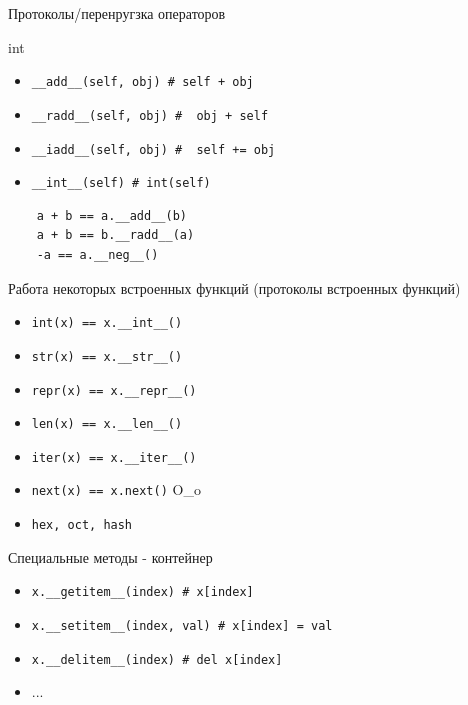 \documentclass{article}
\begin{document}
\begin{center} Протоколы/перенругзка операторов \end{center}
\begin{center} int \end{center}
\begin{itemize}
    \item \lstinline!__add__(self, obj) # self + obj!
    \item \lstinline!__radd__(self, obj) #  obj + self!
    \item \lstinline!__iadd__(self, obj) #  self += obj!
    \item \lstinline!__int__(self) # int(self)!
\end{itemize}
\begin{lstlisting}
    a + b == a.__add__(b)
    a + b == b.__radd__(a)
    -a == a.__neg__()
\end{lstlisting}
\newpage

\begin{center} Работа некоторых встроенных функций (протоколы встроенных функций) \end{center}
\begin{itemize}
    \item \lstinline!int(x) == x.__int__()!
    \item \lstinline!str(x) == x.__str__()!
    \item \lstinline!repr(x) == x.__repr__()!
    \item \lstinline!len(x) == x.__len__()!
    \item \lstinline!iter(x) == x.__iter__()!
    \item \lstinline!next(x) == x.next()! O\_o
    \item \lstinline!hex, oct, hash!
\end{itemize}
\newpage

\begin{center} Специальные методы - контейнер \end{center}
\begin{itemize}
    \item \lstinline!x.__getitem__(index) # x[index]!
    \item \lstinline!x.__setitem__(index, val) # x[index] = val!
    \item \lstinline!x.__delitem__(index) # del x[index]!
    \item ...
\end{itemize}
\newpage
\end{document}
